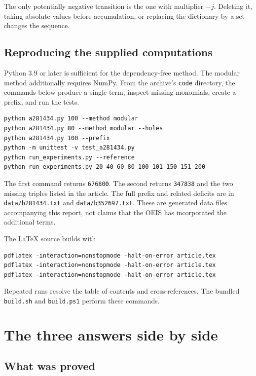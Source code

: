 \documentclass[11pt,a4paper]{article}
\numberwithin{equation}{section}
\theoremstyle{definition}
\theoremstyle{remark}
\theoremstyle{plain}
\begin{document}
The only potentially negative transition is the one with multiplier $-j$.
Deleting it, taking absolute values before accumulation, or replacing the
dictionary by a set changes the sequence.

\subsection{Reproducing the supplied computations}

Python 3.9 or later is sufficient for the dependency-free method. The modular
method additionally requires NumPy. From the archive's \texttt{code}
directory, the commands below produce a single term, inspect missing
monomials, create a prefix, and run the tests.
\begin{lstlisting}[language={}]
python a281434.py 100 --method modular
python a281434.py 80 --method modular --holes
python a281434.py 100 --prefix
python -m unittest -v test_a281434.py
python run_experiments.py --reference
python run_experiments.py 20 40 60 80 100 101 150 151 200
\end{lstlisting}
The first command returns \texttt{676800}. The second returns
\texttt{347838} and the two missing triples listed in the article.
The full prefix and related deficits are in \texttt{data/b281434.txt} and
\texttt{data/b352697.txt}. These are generated data files accompanying this
report, not claims that the OEIS has incorporated the additional terms.

The LaTeX source builds with
\begin{lstlisting}[language={}]
pdflatex -interaction=nonstopmode -halt-on-error article.tex
pdflatex -interaction=nonstopmode -halt-on-error article.tex
pdflatex -interaction=nonstopmode -halt-on-error article.tex
\end{lstlisting}
Repeated runs resolve the table of contents and cross-references. The bundled
\texttt{build.sh} and \texttt{build.ps1} perform these commands.


\clearpage
\section{The three answers side by side}\label{syn:sec}

\subsection{What was proved}\label{syn:table}
\end{document}
